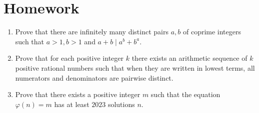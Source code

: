 \documentclass{article}
\begin{document}
\section{Homework}
\begin{enumerate}
  \item Prove that there are infinitely many distinct pairs $a,b$ of coprime
    integers such that $a>1,b>1$ and $a+b\mid a^b+b^a$.
  \item Prove that for each positive integer $k$ there exists an arithmetic
    sequence of $k$ positive rational numbers such that when they are written in lowest
    terms, all numerators and denominators are pairwise distinct.
  \item Prove that there exists a positive integer $m$ such that the equation
    $\varphi(n)=m$ has at least $2023$ solutions $n$.
\end{enumerate}
\end{document}
